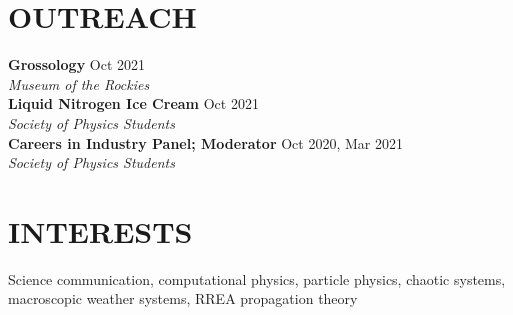 \documentclass[margin]{res}
\begin{document}
\begin{resume}

\section{OUTREACH}
\textbf{Grossology} \hfill Oct 2021\\
\textit{Museum of the Rockies}\\
\textbf{Liquid Nitrogen Ice Cream} \hfill Oct 2021\\
\textit{Society of Physics Students}\\
\textbf{Careers in Industry Panel; Moderator} \hfill Oct 2020, Mar 2021\\
\textit{Society of Physics Students}


\section{INTERESTS}
Science communication, computational physics, particle physics, chaotic systems, macroscopic weather systems, RREA propagation theory
\end{resume}
\end{document}
